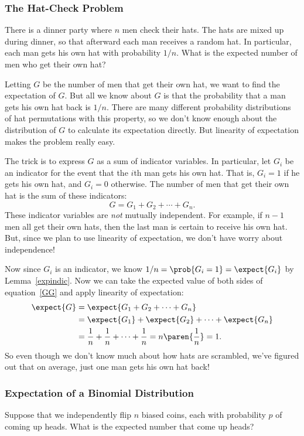 \subsubsection{The Hat-Check Problem}

There is a dinner party where $n$ men check their hats.  The hats are
mixed up during dinner, so that afterward each man receives a random hat.
In particular, each man gets his own hat with probability $1/n$.  What is
the expected number of men who get their own hat?

Letting $G$ be the number of men that get their own hat, we want to find
the expectation of $G$.  But all we know about $G$ is that the probability
that a man gets his own hat back is $1/n$.  There are many different
probability distributions of hat permutations with this property, so we
don't know enough about the distribution of $G$ to calculate its
expectation directly.  But linearity of expectation makes the problem
really easy.

The trick is to express $G$ as a sum of indicator variables.  In
particular, let $G_i$ be an indicator for the event that the $i$th man
gets his own hat.  That is, $G_i = 1$ if he gets his own hat, and $G_i =
0$ otherwise.  The number of men that get their own hat is the sum of
these indicators:
%
\begin{equation}\label{GG}
G = G_1 + G_2 + \cdots + G_n.
\end{equation}
%
These indicator variables are \emph{not} mutually independent.  For
example, if $n-1$ men all get their own hats, then the last man is
certain to receive his own hat.  But, since we plan to use linearity
of expectation, we don't have worry about independence!

Now since $G_i$ is an indicator, we know $1/n = \prob{G_i=1} = \expect{G_i}$
by Lemma~\ref{expindic}.  Now we can take the expected value of both sides
of equation~\eqref{GG} and apply linearity of expectation:
\begin{align*}
\expect{G} & = \expect{G_1 + G_2 + \cdots + G_n} \\
       & = \expect{G_1} + \expect{G_2} + \cdots + \expect{G_n}\\
       & = \frac{1}{n} + \frac{1}{n} + \cdots + \frac{1}{n} =
       n\paren{\frac{1}{n}} = 1.
\end{align*}
So even though we don't know much about how hats are scrambled, we've
figured out that on average, just one man gets his own hat back!


\subsubsection{Expectation of a Binomial Distribution}
Suppose that we independently flip $n$ biased coins, each with probability
$p$ of coming up heads.  What is the expected number that come up heads?

